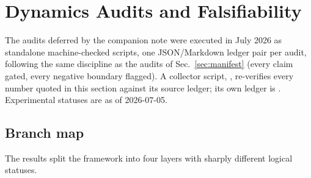 \documentclass[
  aps,
  prd,
  preprint,
  nofootinbib,
  superscriptaddress,
  longbibliography
]{revtex4-2}
\begin{document}
\section{Dynamics Audits and Falsifiability}
\label{sec:falsifiability}

The audits deferred by the companion note were executed in July 2026 as
standalone machine-checked scripts, one JSON/Markdown ledger pair per
audit, following the same discipline as the audits of
Sec.~\ref{sec:manifest} (every claim gated, every negative boundary
flagged).  A collector script,
, re-verifies
every number quoted in this section against its source ledger; its own
ledger is .
Experimental statuses are as of 2026-07-05.

\subsection{Branch map}
\label{sec:branchmap}

The results split the framework into four layers with sharply different
logical statuses.
\end{document}
